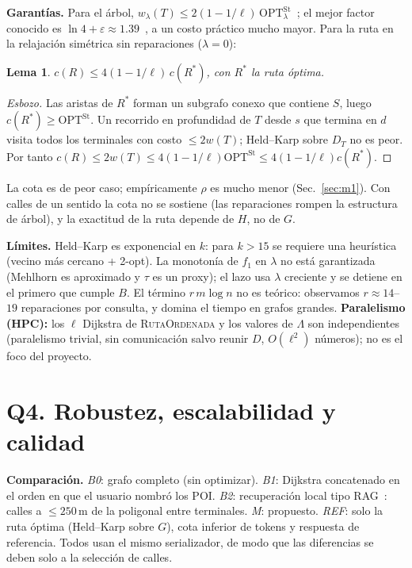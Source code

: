 \documentclass[conference,10pt]{IEEEtran}
\newtheorem{lemma}{Lema}
\newcommand{\Sterm}{S}
\begin{document}
\textbf{Garantías.} Para el árbol, $w_\lambda(T)\le 2(1-1/\ell)\,\mathrm{OPT}^{\text{St}}_\lambda$~\cite{kmb1981,mehlhorn1988}; el mejor factor conocido es $\ln 4+\varepsilon\approx1.39$~\cite{byrka2013}, a un costo práctico mucho mayor. Para la ruta en la relajación simétrica sin reparaciones ($\lambda=0$):
\begin{lemma}
$c(R)\le 4(1-1/\ell)\,c(R^*)$, con $R^*$ la ruta óptima.
\end{lemma}
\begin{proof}[Esbozo]
Las aristas de $R^*$ forman un subgrafo conexo que contiene $\Sterm$, luego $c(R^*)\ge\mathrm{OPT}^{\text{St}}$. Un recorrido en profundidad de $T$ desde $s$ que termina en $d$ visita todos los terminales con costo $\le 2w(T)$; Held--Karp sobre $D_T$ no es peor. Por tanto $c(R)\le 2w(T)\le 4(1-1/\ell)\mathrm{OPT}^{\text{St}}\le 4(1-1/\ell)c(R^*)$.
\end{proof}
La cota es de peor caso; empíricamente $\rho$ es mucho menor (Sec.~\ref{sec:m1}). Con calles de un sentido la cota no se sostiene (las reparaciones rompen la estructura de árbol), y la exactitud de la ruta depende de $H$, no de $G$.

\textbf{Límites.} Held--Karp es exponencial en $k$: para $k>15$ se requiere una heurística (vecino más cercano + 2-opt). La monotonía de $f_1$ en $\lambda$ no está garantizada (Mehlhorn es aproximado y $\tau$ es un proxy); el lazo usa $\lambda$ creciente y se detiene en el primero que cumple $B$. El término $r\,m\log n$ no es teórico: observamos $r\approx14$--$19$ reparaciones por consulta, y domina el tiempo en grafos grandes. \textbf{Paralelismo (HPC):} los $\ell$ Dijkstra de \textsc{RutaOrdenada} y los valores de $\Lambda$ son independientes (paralelismo trivial, sin comunicación salvo reunir $D$, $O(\ell^2)$ números); no es el foco del proyecto.

\section{Q4. Robustez, escalabilidad y calidad}
\textbf{Comparación.} \emph{B0}: grafo completo (sin optimizar). \emph{B1}: Dijkstra concatenado en el orden en que el usuario nombró los POI. \emph{B2}: recuperación local tipo RAG~\cite{lewis2020rag}: calles a $\le 250$\,m de la poligonal entre terminales. \emph{M}: propuesto. \emph{REF}: solo la ruta óptima (Held--Karp sobre $G$), cota inferior de tokens y respuesta de referencia. Todos usan el mismo serializador, de modo que las diferencias se deben solo a la selección de calles.
\end{document}
